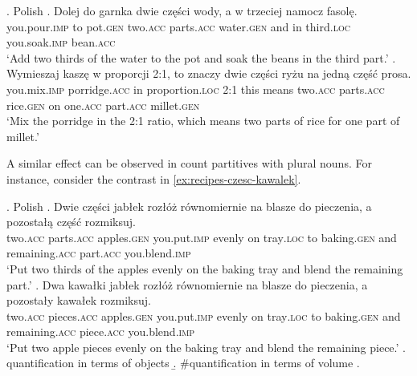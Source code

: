 \ex. Polish\label{ex:recipes-czesc}
\ag. Dolej do garnka dwie części wody, a w trzeciej namocz fasolę.\label{ex:recipes-czesc-mass}\\
you.pour\textsc{.imp} to pot\textsc{.gen} two\textsc{.acc} parts\textsc{.acc} water\textsc{.gen} and in third\textsc{.loc} you.soak\textsc{.imp} bean\textsc{.acc}\\
`Add two thirds of the water to the pot and soak the beans in the third part.'
\bg. Wymieszaj kaszę w proporcji 2:1, to znaczy dwie części ryżu na jedną część prosa.\label{ex:recipes-czesc-granular}\\
you.mix\textsc{.imp} porridge\textsc{.acc} in proportion\textsc{.loc} 2:1 this means two\textsc{.acc} parts\textsc{.acc} rice\textsc{.gen} on one\textsc{.acc} part\textsc{.acc} millet\textsc{.gen}\\
`Mix the porridge in the 2:1 ratio, which means two parts of rice for one part of millet.'

A similar effect can be observed in count partitives with plural nouns. For instance, consider the contrast in \ref{ex:recipes-czesc-kawalek}.\largerpage[2]

\ex. Polish\label{ex:recipes-czesc-kawalek}
\ag. Dwie części jabłek rozłóż równomiernie na blasze do pieczenia, a pozostałą część rozmiksuj.\label{ex:recipes-czesc-count}\\
two\textsc{.acc} parts\textsc{.acc} apples\textsc{.gen} you.put\textsc{.imp} evenly on tray\textsc{.loc} to baking\textsc{.gen} and remaining\textsc{.acc} part\textsc{.acc} you.blend\textsc{.imp}\\
`Put two thirds of the apples evenly on the baking tray and blend the remaining part.'
\bg.  Dwa kawałki jabłek rozłóż równomiernie na blasze do pieczenia, a pozostały kawałek rozmiksuj.\label{ex:recipes-kawalek-count}\\
two\textsc{.acc} pieces\textsc{.acc} apples\textsc{.gen} you.put\textsc{.imp} evenly on tray\textsc{.loc} to baking\textsc{.gen} and remaining\textsc{.acc} piece\textsc{.acc} you.blend\textsc{.imp}\\
`Put two apple pieces evenly on the baking tray and blend the remaining piece.'
  \a. quantification in terms of objects
  \b. \#quantification in terms of volume
  \z.

